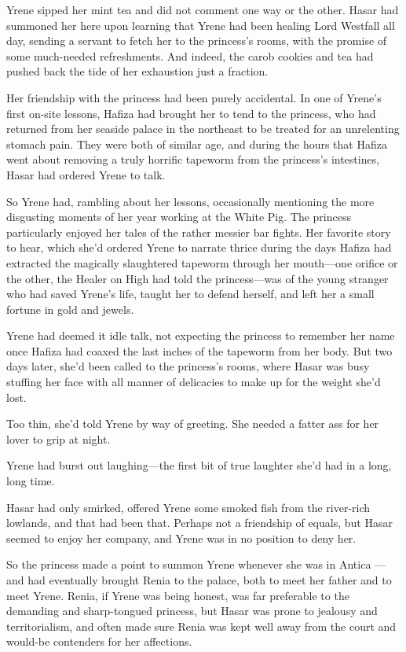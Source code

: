 Yrene sipped her mint tea and did not comment one way or the other.
Hasar had summoned her here upon learning that Yrene had been healing Lord Westfall all day, sending a servant to fetch her to the princess's rooms, with the promise of some much-needed refreshments.
And indeed, the carob cookies and tea had pushed back the tide of her exhaustion just a fraction.

Her friendship with the princess had been purely accidental.
In one of Yrene's first on-site lessons, Hafiza had brought her to tend to the princess, who had returned from her seaside palace in the northeast to be treated for an unrelenting stomach pain.
They were both of similar age, and during the hours that Hafiza went about removing a truly horrific tapeworm from the princess's intestines, Hasar had ordered Yrene to talk.

So Yrene had, rambling about her lessons, occasionally mentioning the more disgusting moments of her year working at the White Pig.
The princess particularly enjoyed her tales of the rather messier bar fights.
Her favorite story to hear, which she'd ordered Yrene to narrate thrice during the days Hafiza had extracted the magically slaughtered tapeworm through her mouth---one orifice or the other, the Healer on High had told the princess---was of the young stranger who had saved Yrene's life, taught her to defend herself, and left her a small fortune in gold and jewels.

Yrene had deemed it idle talk, not expecting the princess to remember her name once Hafiza had coaxed the last inches of the tapeworm from her body.
But two days later, she'd been called to the princess's rooms, where Hasar was busy stuffing her face with all manner of delicacies to make up for the weight she'd lost.

Too thin, she'd told Yrene by way of greeting.
She needed a fatter ass for her lover to grip at night.

Yrene had burst out laughing---the first bit of true laughter she'd had in a long, long time.

Hasar had only smirked, offered Yrene some smoked fish from the river-rich lowlands, and that had been that.
Perhaps not a friendship of equals, but Hasar seemed to enjoy her company, and Yrene was in no position to deny her.

So the princess made a point to summon Yrene whenever she was in Antica ---and had eventually brought Renia to the palace, both to meet her father and to meet Yrene.
Renia, if Yrene was being honest, was far preferable to the demanding and sharp-tongued princess, but Hasar was prone to jealousy and territorialism, and often made sure Renia was kept well away from the court and would-be contenders for her affections.

